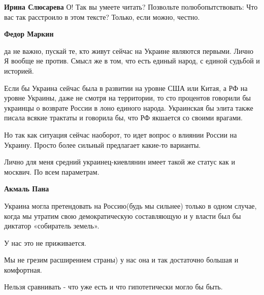 \begin{itemize}
\begin{itemize}
 
\textbf{Ирина Слюсарева} О! Так вы умеете читать? Позвольте полюбопытствовать: Что вас так расстроило в этом тексте? Только, если можно, честно.

 
\textbf{Федор Маркин} 

да не важно, пускай те, кто живут сейчас на Украине являются первыми. Лично Я
вообще не против. Смысл же в том, что есть единый народ, с единой судьбой и
историей.

Если бы Украина сейчас была в развитии на уровне США или Китая, а РФ на уровне
Украины, даже не смотря на территории, то сто процентов говорили бы украинцы о
возврате России в лоно единого народа. Украинская бы элита также писала всякие
трактаты и говорила бы, что РФ якшается со своими врагами.

Но так как ситуация сейчас наоборот, то идет вопрос о влиянии России на
Украину. Просто более сильный предлагает какие-то варианты.

Лично для меня средний украинец-киевлянин имеет такой же статус как и москвич.
По всем параметрам.

 
\textbf{Акмаль Пана} 

Украина могла претендовать на Россию(будь мы сильнее) только в одном случае,
когда мы утратим свою демократическую составляющую и у власти был бы диктатор
«собиратель земель».

У нас это не приживается.

Мы не грезим расширением страны) у нас она и так достаточно большая и
комфортная.

Нельзя сравнивать - что уже есть и что гипотетически могло бы быть.

 

\end{itemize}
\end{itemize}
